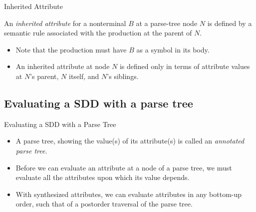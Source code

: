 \begin{bibunit}[apalike]
\begin{frame}{Inherited Attribute}
	\begin{definition}
		An \emph{inherited attribute} for a nonterminal $B$ at a parse-tree node $N$ is defined by a semantic rule associated with the production at the parent of $N$.
	\end{definition}
	\vfill
	\begin{itemize}
	\item Note that the production must have $B$ as a symbol in its body. 
	\vfill
	\item An inherited attribute at node $N$ is defined only in terms of attribute values at $N$'s parent, $N$ itself, and $N$'s siblings.
	\end{itemize}
\end{frame}

\subsection{Evaluating a SDD with a parse tree}

\tableofcontentslide[sections={1-4},sectionstyle={show/shaded},subsectionstyle={show/shaded/hide},subsubsectionstyle={show/show/hide/hide}]

\begin{frame}{Evaluating a SDD with a Parse Tree}
	\vfill
	\begin{itemize}
	\item A parse tree, showing the value(s) of its attribute(s) is called an \emph{annotated parse tree}.
	\vfill
	\item Before we can evaluate an attribute at a node of a parse tree, we must evaluate all the attributes upon which its value depends.
	\vfill
	\item With synthesized attributes, we can evaluate attributes in any bottom-up order, such that of a postorder traversal of the parse tree.
	\end{itemize}
\end{frame}



\end{bibunit}
